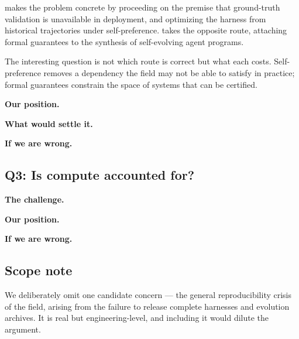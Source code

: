 \cite{pan2026rho} makes the problem concrete by proceeding on the premise that
ground-truth validation is unavailable in deployment, and optimizing the harness
from historical trajectories under self-preference. \cite{banerjee2026severa}
takes the opposite route, attaching formal guarantees to the synthesis of
self-evolving agent programs.

The interesting question is not which route is correct but what each costs.
Self-preference removes a dependency the field may not be able to satisfy in
practice; formal guarantees constrain the space of systems that can be
certified. 

\textbf{Our position.} \todo{}

\textbf{What would settle it.} 

\textbf{If we are wrong.} 

\subsection{Q3: Is compute accounted for?}

\textbf{The challenge.} 

\textbf{Our position.} \todo{}

\textbf{If we are wrong.} 

\subsection{Scope note}

We deliberately omit one candidate concern --- the general reproducibility
crisis of the field, arising from the failure to release complete harnesses and
evolution archives. It is real but engineering-level, and including it would
dilute the argument.

